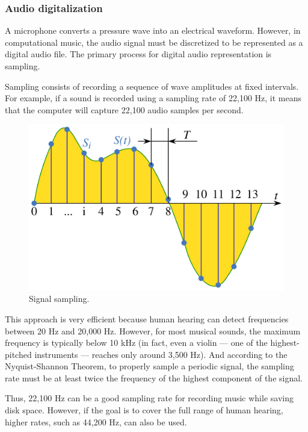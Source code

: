\documentclass[sigconf,natbib=false]{acmart}
\begin{document}
\subsubsection{Audio digitalization}

A microphone converts a pressure wave into an electrical waveform. However, in computational music, the audio signal must be discretized to be represented as a digital audio file. The primary process for digital audio representation is sampling.

Sampling consists of recording a sequence of wave amplitudes at fixed intervals. For example, if a sound is recorded using a sampling rate of 22,100 Hz, it means that the computer will capture 22,100 audio samples per second.

\begin{figure}[h]
 \centering
 \includegraphics[width=\linewidth]{figs/signal_sampling.png}
 \caption{Signal sampling.}
\end{figure}

This approach is very efficient because human hearing can detect frequencies between 20 Hz and 20,000 Hz. However, for most musical sounds, the maximum frequency is typically below 10 kHz (in fact, even a violin — one of the highest-pitched instruments — reaches only around 3,500 Hz). And according to the Nyquist-Shannon Theorem, to properly sample a periodic signal, the sampling rate must be at least twice the frequency of the highest component of the signal.

Thus, 22,100 Hz can be a good sampling rate for recording music while saving disk space. However, if the goal is to cover the full range of human hearing, higher rates, such as 44,200 Hz, can also be used.
\end{document}
